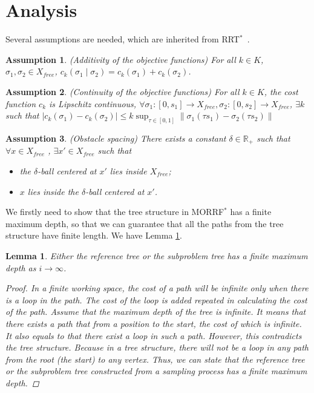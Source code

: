 \documentclass[conference]{IEEEtran}
\newtheorem{lem}{Lemma}
\newtheorem{asmp}{Assumption}
\begin{document}
\section{Analysis}
\label{sec:theoretic_analysis}

Several assumptions are needed, which are inherited from RRT$^{*}$~\cite{Karaman.Frazzoli:RSS10}.
\begin{asmp}{(Additivity of the objective functions)}
\label{asmp:additivity}	
For all $ k \in K $, $ \sigma_{1} , \sigma_{2} \in X_{free} $,
$ c_{k} ( \sigma_{1}  \mid \sigma_{2} ) = c_{k} ( \sigma_{1} ) + c_{k} ( \sigma_{2} ) $.
\end{asmp}

\begin{asmp}{(Continuity of the objective functions)}
\label{asmp:continuity}
For all $ k \in K $, the cost function $ c_{k} $ is Lipschitz continuous,
$ \forall \sigma_{1} : [ 0, s_{1} ] \rightarrow X_{free}, \sigma_{2} : [0, s_{2} ] \rightarrow X_{free} $,
$ \exists k $ such that 
$ | c_{k} ( \sigma_{1} ) - c_{k} ( \sigma_{2} ) | \leq k \sup_{\tau \in [0,1]} \lVert \sigma_{1} (\tau s_{1}) - \sigma_{2} (\tau s_{2}) \rVert $
\end{asmp}

\begin{asmp}{(Obstacle spacing)}
\label{asmp:spacing}
There exists a constant $ \delta \in \mathbb{R}_{+} $ such that $ \forall x \in X_{free} $ , $ \exists x' \in X_{free} $ such that
\begin{itemize}
\item the $ \delta $-ball centered at $ x' $ lies inside $ X_{free} $;
\item $ x $ lies inside the $ \delta $-ball centered at $ x' $.
\end{itemize}
\end{asmp}

We firstly need to show that the tree structure in MORRF$ ^{*}$ has a finite maximum depth,
so that we can guarantee that all the paths from the tree structure have finite length.
We have Lemma \ref{lem:tree:finite_depth}.

\begin{lem}
\label{lem:tree:finite_depth}
Either the reference tree or the subproblem tree has a finite maximum depth as $ i \rightarrow \infty $.
\begin{proof}
In a finite working space, the cost of a path will be infinite only when there is a loop in the path.
The cost of the loop is added repeated in calculating the cost of the path.
Assume that the maximum depth of the tree is infinite.
It means that there exists a path that from a position to the start, the cost of which is infinite.
It also equals to that there exist a loop in such a path.
However, this contradicts the tree structure. 
Because in a tree structure, there will not be a loop in any path from the root (the start) to any vertex.
Thus, we can state that the reference tree or the subproblem tree constructed from a sampling process has a finite maximum depth.
\end{proof}
\end{lem}
\end{document}
